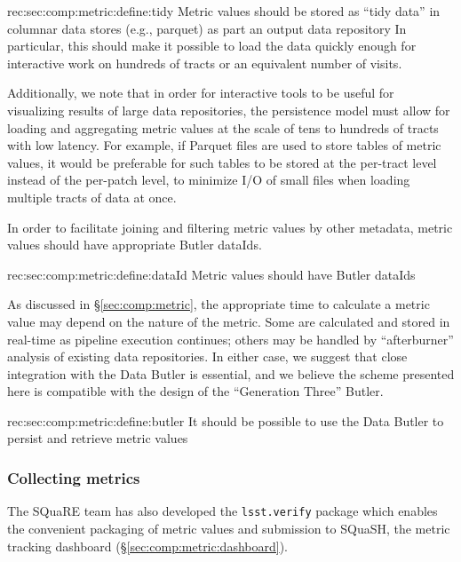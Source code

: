 \begin{recommendation}
    {rec:sec:comp:metric:define:tidy}
    {Metric values should be stored as ``tidy data'' in columnar data stores (e.g., \gls{parquet}) as part an output data repository}
In particular, this should make it possible to load the data quickly enough for interactive work on hundreds of tracts or an equivalent number of visits.
\end{recommendation}

Additionally, we note that in order for interactive tools to be useful for visualizing results of large data repositories, the persistence model must allow for loading and aggregating metric values at the scale of tens to hundreds of tracts with low latency.
For example, if Parquet files are used to store tables of metric values, it would be preferable for such tables to be stored at the per-tract level instead of the per-patch level, to minimize I/O of small files when loading multiple tracts of data at once.

In order to facilitate joining and filtering metric values by other metadata, metric values should have appropriate Butler dataIds.

\begin{recommendation}
    {rec:sec:comp:metric:define:dataId}
    {Metric values should have Butler dataIds}
\end{recommendation}

As discussed in \S\ref{sec:comp:metric}, the appropriate time to calculate a metric value may depend on the nature of the metric.
Some are calculated and stored in real-time as pipeline execution continues; others may be handled by ``afterburner'' analysis of existing data repositories.
In either case, we suggest that close integration with the Data Butler is essential, and we believe the scheme presented here is compatible with the design of the ``Generation Three'' Butler.

\begin{recommendation}
    {rec:sec:comp:metric:define:butler}
    {It should be possible to use the Data Butler to persist and retrieve metric values}
\end{recommendation}

\subsubsection{Collecting metrics}
\label{sec:comp:metric:collect}

The SQuaRE team has also developed the \texttt{lsst.verify} package which enables the convenient packaging of metric values and submission to SQuaSH, the metric tracking dashboard (\S\ref{sec:comp:metric:dashboard}).

